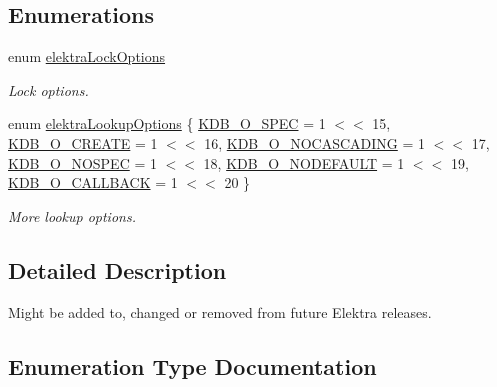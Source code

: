 \subsection*{Enumerations}
\begin{DoxyCompactItemize}
\item 
\mbox{\label{group__proposal_ga824e384e248ed1e05448294bff7271c0}} 
enum \hyperlink{group__proposal_ga824e384e248ed1e05448294bff7271c0}{elektra\+Lock\+Options} \begin{DoxyCompactList}\small\item\em Lock options. \end{DoxyCompactList}
\item 
enum \hyperlink{group__proposal_ga93673533c4c8eb1fdfca76b98c5f49b0}{elektra\+Lookup\+Options} \{ \newline
\hyperlink{group__proposal_gga93673533c4c8eb1fdfca76b98c5f49b0a187bc7e52493fb8f1eb5693015478dae}{K\+D\+B\+\_\+\+O\+\_\+\+S\+P\+EC} = 1 $<$$<$ 15, 
\hyperlink{group__proposal_gga93673533c4c8eb1fdfca76b98c5f49b0a72155bedec545b2e96372ab28169620a}{K\+D\+B\+\_\+\+O\+\_\+\+C\+R\+E\+A\+TE} = 1 $<$$<$ 16, 
\hyperlink{group__proposal_gga93673533c4c8eb1fdfca76b98c5f49b0abc4c6e04823b6d684f4db8df3b84f326}{K\+D\+B\+\_\+\+O\+\_\+\+N\+O\+C\+A\+S\+C\+A\+D\+I\+NG} = 1 $<$$<$ 17, 
\hyperlink{group__proposal_gga93673533c4c8eb1fdfca76b98c5f49b0a420d8ea3671ffea4fe8400570cfe5c8d}{K\+D\+B\+\_\+\+O\+\_\+\+N\+O\+S\+P\+EC} = 1 $<$$<$ 18, 
\newline
\hyperlink{group__proposal_gga93673533c4c8eb1fdfca76b98c5f49b0abdcfd6d28200b5c650615fba430496bb}{K\+D\+B\+\_\+\+O\+\_\+\+N\+O\+D\+E\+F\+A\+U\+LT} = 1 $<$$<$ 19, 
\hyperlink{group__proposal_gga93673533c4c8eb1fdfca76b98c5f49b0a70ac5d04d6f855e17e4c33dfeeddd39e}{K\+D\+B\+\_\+\+O\+\_\+\+C\+A\+L\+L\+B\+A\+CK} = 1 $<$$<$ 20
 \}\begin{DoxyCompactList}\small\item\em More lookup options. \end{DoxyCompactList}
\end{DoxyCompactItemize}


\subsection{Detailed Description}
Might be added to, changed or removed from future Elektra releases. 



\subsection{Enumeration Type Documentation}
\mbox{\label{group__proposal_ga93673533c4c8eb1fdfca76b98c5f49b0}} 
